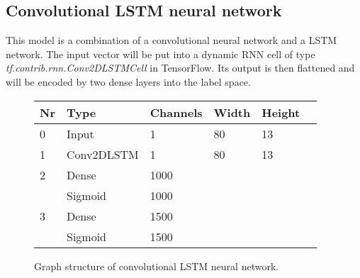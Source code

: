 \subsection*{Convolutional LSTM neural network}
This model is a combination of a convolutional neural network and a LSTM network. The input vector will be put into a dynamic RNN cell of type \newline\textit{tf.contrib.rnn.Conv2DLSTMCell} in TensorFlow. Its output is then flattened and will be encoded by two dense layers into the label space.
\begin{figure}[h]
	\centering
	\begin{tabular}{|l|l|l|l|l|l|}
		\hline \textbf{Nr} & \textbf{Type} & \textbf{Channels} & \textbf{Width} & \textbf{Height} \\ \hline
		0 & Input & 1 & 80 & 13 \\ \hline
		1 & Conv2DLSTM & 1 & 80 & 13 \\ \hline
		2 & Dense & 1000 & & \\ \hline
		& Sigmoid & 1000 & & \\ \hline
		3 & Dense & 1500 & & \\ \hline
		& Sigmoid & 1500 & & \\ \hline
	\end{tabular}
	\caption[Convolutional LSTM structure]{Graph structure of convolutional LSTM neural network.}
\end{figure}
\FloatBarrier

